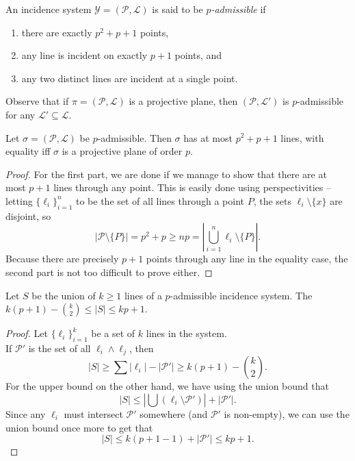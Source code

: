 	\begin{fdef}
		An incidence system $\mathcal{Y} = (\mathcal{P},\mathcal{L})$ is said to be \emph{$p$-admissible} if
		\begin{enumerate}
			\item there are exactly $p^2+p+1$ points,
			\item any line is incident on exactly $p+1$ points, and
			\item any two distinct lines are incident at a single point.
		\end{enumerate}
	\end{fdef}

	Observe that if $\pi = (\mathcal{P},\mathcal{L})$ is a projective plane, then $(\mathcal{P},\mathcal{L}')$ is $p$-admissible for any $\mathcal{L}'\subseteq\mathcal{L}$.

	\begin{lemma}
		Let $\sigma = (\mathcal{P},\mathcal{L})$ be $p$-admissible. Then $\sigma$ has at most $p^2+p+1$ lines, with equality iff $\sigma$ is a projective plane of order $p$.
	\end{lemma}
	\begin{proof}
		For the first part, we are done if we manage to show that there are at most $p+1$ lines through any point. This is easily done using perspectivities -- letting $\{\ell_i\}_{i=1}^n$ to be the set of all lines through a point $P$, the sets $\ell_i \setminus \{x\}$ are disjoint, so 
		\[ |\mathcal{P} \setminus \{P\}| = p^2 + p \ge np = \left| \bigcup_{i=1}^n \ell_i \setminus \{P\} \right|. \]
		Because there are precisely $p+1$ points through any line in the equality case, the second part is not too difficult to prove either.
	\end{proof}

	\begin{lemma}
		Let $S$ be the union of $k \ge 1$ lines of a $p$-admissible incidence system. The  $k(p+1) - \binom{k}{2} \le |S| \le kp+1$.
	\end{lemma}
	\begin{proof}
		Let $\{\ell_i\}_{i=1}^k$ be a set of $k$ lines in the system.\\
		If $\mathcal{P}'$ is the set of all $\ell_i \land \ell_j$, then
		\[ |S| \ge \sum |\ell_i| - |\mathcal{P'}| \ge k(p+1) - \binom{k}{2}. \]
		For the upper bound on the other hand, we have using the union bound that
		\[ |S| \le \left| \bigcup (\ell_i \setminus \mathcal{P}') \right| + |\mathcal{P}'|. \]
		Since any $\ell_i$ must intersect $\mathcal{P}'$ somewhere (and $\mathcal{P}'$ is non-empty), we can use the union bound once more to get that
		\[ |S| \le k(p+1-1) + |\mathcal{P}'| \le kp + 1. \]
	\end{proof}

